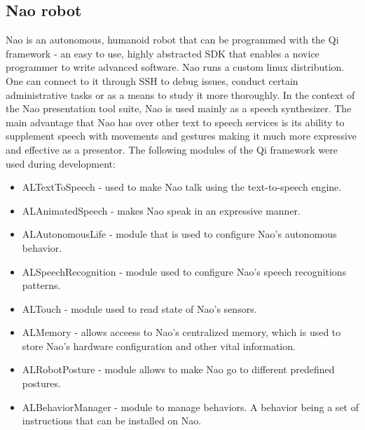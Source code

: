 \documentclass[12pt, fleqn, a4paper]{article}
\begin{document}
\subsection{Nao robot}
Nao is an autonomous, humanoid robot that can be programmed with the Qi framework - an easy to use, highly abstracted SDK that enables a novice programmer to write advanced software.
Nao runs a custom linux distribution. One can connect to it through SSH to debug issues, conduct certain administrative tasks or as a means to study it more thoroughly.
In the context of the Nao presentation tool suite, Nao is used mainly as a speech synthesizer. The main advantage that Nao has over other text to speech services is its ability to supplement speech with movements and gestures making it much more expressive and effective as a presentor.
The following modules of the Qi framework were used during development:
\begin{itemize}
	\item ALTextToSpeech - used to make Nao talk using the text-to-speech engine.
	\item ALAnimatedSpeech - makes Nao speak in an expressive manner.
	\item ALAutonomousLife - module that is used to configure Nao's autonomous behavior.
	\item ALSpeechRecognition - module used to configure Nao's speech recognitions patterns.
	\item ALTouch - module used to read state of Nao's sensors.
	\item ALMemory - allows acceess to Nao's centralized memory, which is used to store Nao's hardware configuration and other vital information.
	\item ALRobotPosture - module allows to make Nao go to different predefined postures.
	\item ALBehaviorManager - module to manage behaviors. A behavior being a set of instructions that can be installed on Nao.
\end{itemize}
\end{document}
